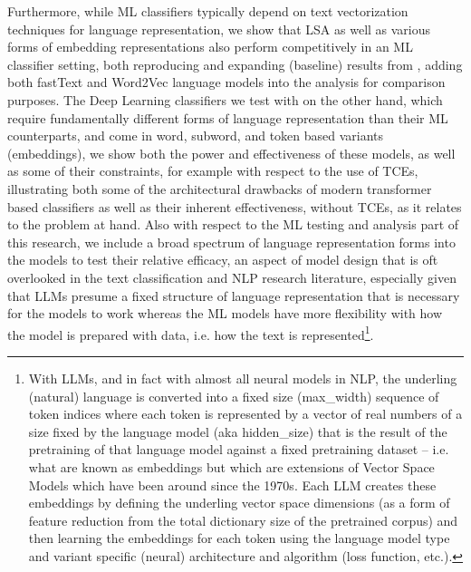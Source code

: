 \documentclass[final]{clv2025}
\begin{document}
Furthermore, while ML classifiers typically depend on text vectorization techniques for language representation, we show that LSA as well as various forms of embedding representations also perform competitively in an ML classifier setting, both reproducing and expanding (baseline) results from \cite{moreo}, adding both fastText and Word2Vec language models into the analysis for comparison purposes. The Deep Learning classifiers we test with on the other hand, which require fundamentally different forms of language representation than their ML counterparts, and come in word, subword, and token based variants (embeddings), we show both the power and effectiveness of these models, as well as some of their constraints, for example with respect to the use of TCEs, illustrating both some of the architectural drawbacks of modern transformer based classifiers as well as their inherent effectiveness, without TCEs, as it relates to the problem at hand. Also with respect to the ML testing and analysis part of this research, we include a broad spectrum of language representation forms into the models to test their relative efficacy, an aspect of model design that is oft overlooked in the text classification and NLP research literature, especially given that LLMs presume a fixed structure of language representation that is necessary for the models to work whereas the ML models have more flexibility with how the model is prepared with data, i.e. how the text is represented\footnote{With LLMs, and in fact with almost all neural models in NLP, the underling (natural) language is converted into a fixed size (max\_width) sequence of token indices where each token is represented by a vector of real numbers of a size fixed by the language model (aka hidden\_size) that is the result of the pretraining of that language model against a fixed pretraining dataset – i.e. what are known as embeddings but which are extensions of Vector Space Models which have been around since the 1970s. Each LLM creates these embeddings by defining the underling vector space dimensions (as a form of feature reduction from the total dictionary size of the pretrained corpus) and then learning the embeddings for each token using the language model type and variant specific (neural) architecture and algorithm (loss function, etc.).}. 
\end{document}
